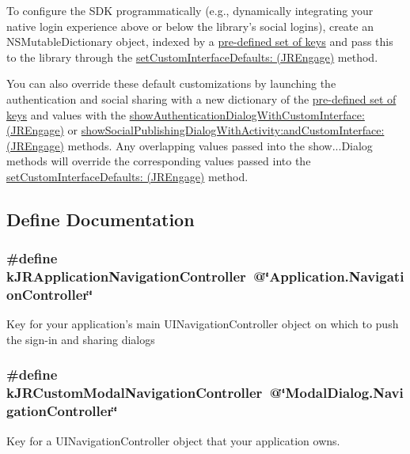 To configure the SDK programmatically (e.g., dynamically integrating your native login experience above or below the library's social logins), create an NSMutableDictionary object, indexed by a \hyperlink{group__custom_interface_customInterfaceKeys}{pre-\/defined set of keys} and pass this to the library through the \hyperlink{class_j_r_engage_ab62496ba7cbc32e0a4f7d91c992c7ca2}{setCustomInterfaceDefaults: (JREngage)} method.

You can also override these default customizations by launching the authentication and social sharing with a new dictionary of the \hyperlink{group__custom_interface_customInterfaceKeys}{pre-\/defined set of keys} and values with the \hyperlink{class_j_r_engage_ac8e1206be8608fbed548b7ec5f85e6e6}{showAuthenticationDialogWithCustomInterface: (JREngage)} or \hyperlink{class_j_r_engage_af5c2aa40f5c45a22f369900d1bd81953}{showSocialPublishingDialogWithActivity:andCustomInterface: (JREngage)} methods. Any overlapping values passed into the {\ttfamily show}...Dialog methods will override the corresponding values passed into the \hyperlink{class_j_r_engage_ab62496ba7cbc32e0a4f7d91c992c7ca2}{setCustomInterfaceDefaults: (JREngage)} method. 

\subsection{Define Documentation}
\hypertarget{group__custom_interface_ga7bace8001f549fc2ecbe84d967d24d22}{
\subsubsection[{kJRApplicationNavigationController}]{\setlength{\rightskip}{0pt plus 5cm}\#define kJRApplicationNavigationController~@\char`\"{}Application.NavigationController\char`\"{}}}
\label{group__custom_interface_ga7bace8001f549fc2ecbe84d967d24d22}
Key for your application's main {\ttfamily UINavigationController} object on which to push the sign-\/in and sharing dialogs \hypertarget{group__custom_interface_ga679ad3bb2027bd7411ab78498b35d1e5}{
\subsubsection[{kJRCustomModalNavigationController}]{\setlength{\rightskip}{0pt plus 5cm}\#define kJRCustomModalNavigationController~@\char`\"{}ModalDialog.NavigationController\char`\"{}}}
\label{group__custom_interface_ga679ad3bb2027bd7411ab78498b35d1e5}
Key for a {\ttfamily UINavigationController} object that your application owns.

